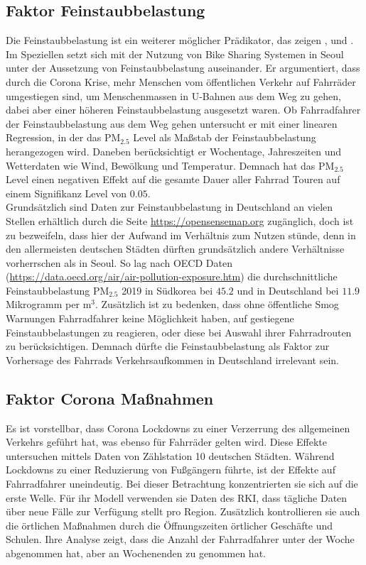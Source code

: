 \documentclass[a4paper,12pt]{thesis}
\begin{document}
\subsection{Faktor Feinstaubbelastung}

Die Feinstaubbelastung ist ein weiterer möglicher Prädikator, das zeigen \cite{ZHAO2018826}, \cite{Gao2022} und \cite{Hong2022}. Im Speziellen setzt sich \cite{Hong2022} mit der Nutzung von Bike Sharing Systemen in Seoul unter der Aussetzung von Feinstaubbelastung auseinander. Er argumentiert, dass durch die Corona Krise, mehr Menschen vom öffentlichen Verkehr auf Fahrräder umgestiegen sind, um Menschenmassen in U-Bahnen aus dem Weg zu gehen, dabei aber einer höheren Feinstaubbelastung ausgesetzt waren. Ob Fahrradfahrer der Feinstaubbelastung aus dem Weg gehen untersucht er mit einer linearen Regression, in der das PM$_{2.5}$ Level als Maßstab der Feinstaubbelastung herangezogen wird. Daneben berücksichtigt er Wochentage, Jahreszeiten und Wetterdaten wie Wind, Bewölkung und Temperatur. Demnach hat das PM$_{2.5}$ Level einen negativen Effekt auf die gesamte Dauer aller Fahrrad Touren auf einem Signifikanz Level von $0.05$.\\
Grundsätzlich sind Daten zur Feinstaubbelastung in Deutschland an vielen Stellen erhältlich durch die Seite \url{https://opensensemap.org} zugänglich, doch ist zu bezweifeln, dass hier der Aufwand im Verhältnis zum Nutzen stünde, denn in den allermeisten deutschen Städten dürften grundsätzlich andere Verhältnisse vorherrschen als in Seoul. So lag nach OECD Daten (\url{https://data.oecd.org/air/air-pollution-exposure.htm}) die durchschnittliche Feinstaubbelastung PM$_{2.5}$ 2019 in Südkorea bei $45.2$ und in Deutschland bei $11.9$ Mikrogramm per m$^3$. Zusätzlich ist zu bedenken, dass ohne öffentliche Smog Warnungen Fahrradfahrer keine Möglichkeit haben, auf gestiegene Feinstaubbelastungen zu reagieren, oder diese bei Auswahl ihrer Fahrradrouten zu berücksichtigen. Demnach dürfte die Feinstaubbelastung als Faktor zur Vorhersage des Fahrrads Verkehrsaufkommen in Deutschland irrelevant sein.

\subsection{Faktor Corona Maßnahmen}

Es ist vorstellbar, dass Corona Lockdowns zu einer Verzerrung des allgemeinen Verkehrs geführt hat, was ebenso für Fahrräder gelten wird. Diese Effekte untersuchen \cite{Moellers2021} mittels Daten von Zählstation 10 deutschen Städten. Während Lockdowns zu einer Reduzierung von Fußgängern führte, ist der Effekte auf Fahrradfahrer uneindeutig. Bei dieser Betrachtung konzentrierten sie sich auf die erste Welle. Für ihr Modell verwenden sie Daten des RKI, dass tägliche Daten über neue Fälle zur Verfügung stellt pro Region. Zusätzlich kontrollieren sie auch die örtlichen Maßnahmen durch die Öffnungszeiten örtlicher Geschäfte und Schulen. Ihre Analyse zeigt, dass die Anzahl der Fahrradfahrer unter der Woche abgenommen hat, aber an Wochenenden zu genommen hat.
\end{document}
